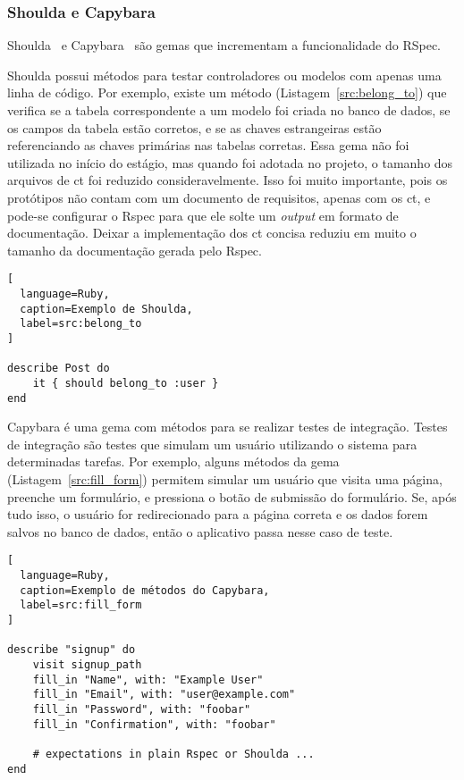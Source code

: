 \subsubsection{Shoulda e Capybara}

Shoulda~\cite{Shoulda} e Capybara~\cite{Capybara} são gemas que incrementam a funcionalidade do RSpec.

Shoulda possui métodos para testar controladores ou modelos com apenas uma linha de código. Por exemplo, existe um método (Listagem~\ref{src:belong_to})
que verifica se a tabela correspondente
a um modelo foi criada no banco de dados, se os campos da tabela estão corretos, e se as chaves estrangeiras estão referenciando as chaves primárias nas 
tabelas corretas. Essa gema não foi utilizada no início do estágio, mas quando foi adotada no projeto, o tamanho dos arquivos de \gls{ct} foi reduzido 
consideravelmente. Isso foi muito importante, pois os protótipos não contam com um documento de requisitos, apenas com os \gls{ct}, e pode-se 
configurar o Rspec para que ele solte um \textit{output} em formato de documentação. Deixar a implementação dos \gls{ct} concisa reduziu em muito 
o tamanho da documentação gerada pelo Rspec.

\begin{lstlisting}[
  language=Ruby,
  caption=Exemplo de Shoulda,
  label=src:belong_to
]

describe Post do
	it { should belong_to :user }
end

\end{lstlisting}

Capybara é uma gema com métodos para se realizar testes de integração. Testes de integração são testes que simulam um usuário utilizando o sistema para
determinadas tarefas. Por exemplo, alguns métodos da gema (Listagem~\ref{src:fill_form}) permitem simular um usuário que visita uma página,
preenche um formulário, e pressiona o botão de submissão do formulário. Se, após tudo isso, o usuário for redirecionado para a página correta e os dados
forem salvos no banco de dados, então o aplicativo passa nesse caso de teste.

\begin{lstlisting}[
  language=Ruby,
  caption=Exemplo de métodos do Capybara,
  label=src:fill_form
]

describe "signup" do
	visit signup_path
	fill_in "Name", with: "Example User"
	fill_in "Email", with: "user@example.com"
	fill_in "Password", with: "foobar"
	fill_in "Confirmation", with: "foobar"
	
	# expectations in plain Rspec or Shoulda ...
end

\end{lstlisting}

